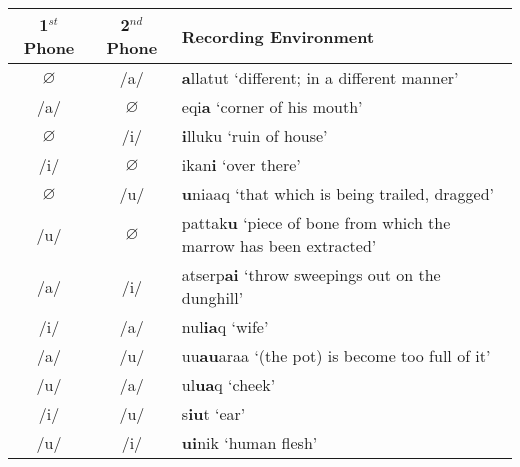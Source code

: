\documentclass[12pt]{article}
\begin{document}
	\begin{centering}
	\begin{tabular}{|c|c|l|}
	\hline
	1$^{st}$ Phone & 2$^{nd}$ Phone & Recording Environment \\
	\hline
	$\varnothing$ & /a/ & \textbf{a}llatut `different; in a different manner'\\
	/a/ & $\varnothing$ & eqi\textbf{a} `corner of his mouth'\\
	$\varnothing$ & /i/ & \textbf{i}lluku `ruin of house'\\
	/i/ & $\varnothing$ & ikan\textbf{i} `over there'\\
	$\varnothing$ & /u/ & \textbf{u}niaaq `that which is being trailed, dragged'\\
	/u/ & $\varnothing$ & pattak\textbf{u} `piece of bone from which the marrow has been extracted'\\
	/a/ & /i/ & atserp\textbf{ai} `throw sweepings out on the dunghill' \\
	/i/ & /a/ & nul\textbf{ia}q `wife' \\
	/a/ & /u/ & uu\textbf{au}araa `(the pot) is become too full of it' \\
	/u/ & /a/ & ul\textbf{ua}q `cheek' \\
	/i/ & /u/ & s\textbf{iu}t `ear' \\
	/u/ & /i/ & \textbf{ui}nik `human flesh' \\
	\hline
	\end{tabular}
	\end{centering}
	\newpage
\end{document}
